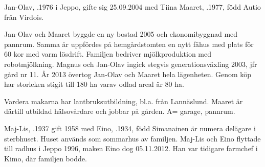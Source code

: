 %



%
Jan-Olav, .1976 i Jeppo, gifte sig 25.09.2004 med Tiina Maaret, .1977, född Autio från Virdois.
\begin{jhchildren}
  \item {}
  \item {}
  \item {}
  \item {}
  \item {}
\end{jhchildren}

Jan-Olav och Maaret byggde en ny bostad 2005 och ekonomibyggnad med pannrum. Samma år uppfördes på hemgårdstomten en nytt fähus med plats för 60 kor med varm lösdrift. Familjen bedriver mjölkproduktion med robotmjölkning. Magnus och Jan-Olav ingick stegvis generationsväxling 2003, jfr gård nr 11. År 2013 övertog Jan-Olav och Maaret hela lägenheten. Genom köp har storleken stigit till 180 ha varav odlad areal är 80 ha.

Vardera makarna har lantbruksutbildning, bl.a. från Lannäslund. Maaret är därtill utbildad hälsovårdare och jobbar på gården. A= garage, pannrum.



%



%
Maj-Lis, .1937 gift 1958 med Eino, .1934, född Simanainen är numera delägare i sterbhuset.  Huset används som sommarhus av familjen. Maj-Lis och Eino flyttade till radhus i Jeppo 1996, maken Eino dog 05.11.2012. Han var tidigare farmchef i Kimo, där familjen bodde.\jhvspace{}



